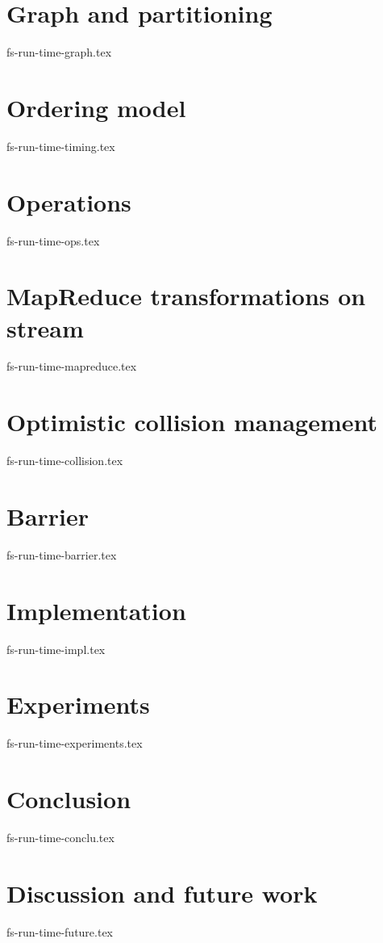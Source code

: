 \documentclass[sigconf]{acmart-edbt2018}
\theoremstyle{remark}
\begin{document}
\section {Graph and partitioning}
 {fs-run-time-graph.tex}

\section {Ordering model}
 {fs-run-time-timing.tex}

\section {Operations}
 {fs-run-time-ops.tex}

\section {MapReduce transformations on stream}
 {fs-run-time-mapreduce.tex}

\section {Optimistic collision management}
 {fs-run-time-collision.tex}

\section {Barrier}
 {fs-run-time-barrier.tex}

\section {Implementation}
 {fs-run-time-impl.tex}

\section {Experiments}
 {fs-run-time-experiments.tex}

\section {Conclusion}
 {fs-run-time-conclu.tex}

\section {Discussion and future work}
 {fs-run-time-future.tex}



\end{document}
